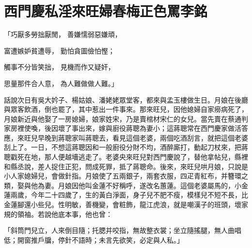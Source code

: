 %

\chapter{西門慶私淫來旺婦\KG 春梅正色罵李銘}

「巧厭多勞拙厭閒，  善嫌懦弱惡嫌頑，

富遭嫉妒貧遭辱，  勤怕貪圖儉怕慳；

觸事不分皆笑拙，  見機而作又疑奸，

思量那件合人意，  為人難做做人難。」

話說次日有吳大妗子、楊姑娘、潘姥姥眾堂客，都來與孟玉樓做生日。月娘在後廳與眾客飲酒，倒也罷了，其中惹出一件事來。那來旺兒，因他媳婦自家癆病死了，月娘新近與他娶了一房媳婦，娘家姓宋，乃是賣棺材宋仁的女兒。當先賣在蔡通判家房裡使喚，後因壞了事出來，嫁與廚役蔣聰為妻小；這蔣聰常在西門慶家做活答應，來旺兒早晚到蔣聰家叫蔣聰去，看見這個老婆，兩個吃酒刮言，就把這個老婆刮上了。一日，不想這蔣聰因和一般廚役分財不均，酒醉廝打，動起刀杖來，把蔣聰戳死在地，那人便越墻逃走了。老婆央來旺兒對西門慶說了，替他拿帖兒，縣裡和縣丞說，差人捉住正犯，問成死罪，抵了蔣聰命。後來，來旺兒哄月娘，只說是小人家媳婦兒，會做針指。月娘使了五兩銀子，兩套衣服，四疋青紅布，并簪環之類，娶與他為妻。月娘因他叫金蓮不好稱呼，遂改名蕙蓮。這個老婆屬馬的，小金蓮兩歲，今年二十四歲了，生的黃白淨面，身子兒不肥不瘦，模樣兒不短不長，比金蓮腳還小些兒。性明敏，善機變，會粧飾，龍江虎浪，就是嘲漢子的班頭，壞家規的領袖。若說他底本事，他也曾：

「斜筒門兒立，人來倒目隨；托腮并咬指，無故整衣裳；坐立隨搖腿，無人曲唱低；開窗推戶牖，停針不語時；未言先欲笑，必定與人私。」

